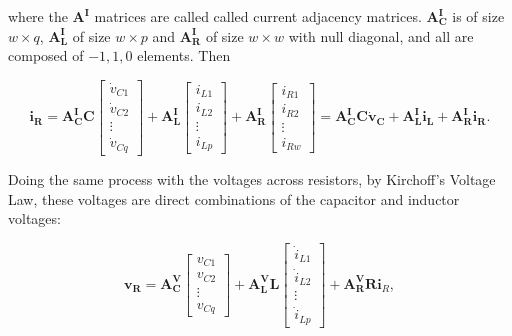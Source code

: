 	\noindent where the $\mathbf{A^I}$ matrices are called called current adjacency matrices. $\mathbf{A^I_C}$ is of size $w\times q$, $\mathbf{A^I_L}$ of size $w\times p$ and $\mathbf{A^I_R}$ of size $w\times w$ with null diagonal, and all are composed of $-1,1,0$ elements. Then

\begin{equation} \mathbf{i_R} = \mathbf{A^I_CC} \left[\begin{array}{c} \dot{v}_{C1} \\[3mm] \dot{v}_{C2} \\[3mm] \vdots \\[3mm] \dot{v}_{Cq} \end{array}\right] + \mathbf{A^I_L}\left[\begin{array}{c} i_{L1} \\[3mm] i_{L2} \\[3mm] \vdots \\[3mm] i_{Lp} \end{array}\right] + \mathbf{A^I_R}\left[\begin{array}{c} i_{R1} \\[3mm] i_{R2} \\[3mm] \vdots \\[3mm] i_{Rw} \end{array}\right] = \mathbf{A^I_CC}\dot{\mathbf{v}}_\mathbf{C} + \mathbf{A^I_Li_L} + \mathbf{A^I_Ri_R}. \label{eq:current_adjacency}\end{equation}

	Doing the same process with the voltages across resistors, by Kirchoff's Voltage Law, these voltages are direct combinations of the capacitor and inductor voltages:

\begin{equation} \mathbf{v_R}= \mathbf{A^V_C} \left[\begin{array}{c} v_{C1} \\[3mm] v_{C2} \\[3mm] \vdots \\[3mm] v_{Cq} \end{array}\right]  + \mathbf{A^V_L}\mathbf{L} \left[\begin{array}{c} \dot{i}_{L1} \\[3mm] \dot{i}_{L2} \\[3mm] \vdots \\[3mm] \dot{i}_{Lp} \end{array}\right] + \mathbf{A^V_R}\mathbf{R}\mathbf{i}_R , \label{eq:voltage_adjacency}\end{equation}

